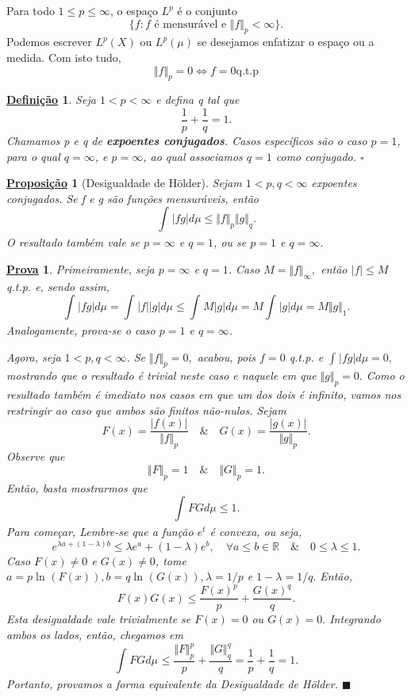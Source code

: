 \documentclass{article}
\newtheorem*{def*}{\underline{Defini\c c\~ao}}
\newtheorem*{prop*}{\underline{Proposi\c c\~ao}}
\newtheorem*{proof*}{\underline{Prova}}
\renewcommand\qedsymbol{$\blacksquare$}
\begin{document}
 Para todo \(1\leq p\leq \infty\), o espaço \(L^{p}\) é o conjunto 
   \[
     \{f: f \text{ é mensurável e }\Vert f \Vert_{p}<\infty\}.
   \]
   Podemos escrever \(L^{p}(X)\) ou \(L^{p}(\mu )\) se desejamos enfatizar o espaço ou a medida. Com isto tudo, 
     \[
       \Vert f \Vert_{p} = 0 \Longleftrightarrow f = 0 \mathrm{q.t.p}
     \]
 \begin{def*}
   Seja \(1 < p < \infty\) e defina q tal que 
     \[
       \frac{1}{p} + \frac{1}{q} = 1.
     \]
  Chamamos p e q de \textbf{expoentes conjugados}. Casos específicos são o caso \(p =1 \), para o qual \(q=\infty\), e \(p = \infty\), ao qual associamos \(q = 1\) como conjugado. \(\square\)
 \end{def*}
 \hypertarget{holder}{
   \begin{prop*}[Desigualdade de Hölder]
    Sejam \(1 < p, q < \infty\) expoentes conjugados. Se f e g são funções mensuráveis, então 
      \[
        \int_{}^{}|fg|d\mu \leq \Vert f \Vert_{p}\Vert g \Vert_{q}.
      \]
    O resultado também vale se \(p=\infty\) e \(q=1\), ou se \(p = 1\) e \(q=\infty\).
  \end{prop*}
 }
\begin{proof*}
  Primeiramente, seja \(p=\infty\) e \(q=1\). Caso \(M = \Vert f \Vert_{\infty},\) então \(|f|\leq M\) q.t.p. e, sendo assim, 
    \[
      \int_{}^{}|fg|d\mu = \int_{}^{}|f||g|d\mu \leq \int_{}^{}M|g|d\mu = M \int_{}^{}|g|d\mu = M \Vert g \Vert_{1}.
    \]
  Analogamente, prova-se o caso \(p=1\) e \(q=\infty\). 

  Agora, seja \(1 < p, q < \infty\). Se \(\Vert f \Vert_{p} = 0,\) acabou, pois \(f=0\) q.t.p. e \(\int_{}^{}|fg|d\mu  = 0,\) mostrando que o resultado é trivial neste caso e naquele em que \(\Vert g \Vert_{p} = 0.\) Como 
o resultado também é imediato nos casos em que um dos dois é infinito, vamos nos restringir ao caso que ambos são finitos não-nulos. Sejam 
  \[
    F(x) = \frac{|f(x)|}{\Vert f \Vert_{p}}\quad\&\quad G(x) = \frac{|g(x)|}{\Vert g \Vert_{p}}.
  \]
  Observe que 
    \[
      \Vert F \Vert_{p} = 1\quad\&\quad \Vert G \Vert_{p} = 1.
    \]
  Então, basta mostrarmos que 
    \[
      \int_{}^{}FGd\mu \leq 1.
    \]
    Para começar, Lembre-se que a função \(e^{t}\) é \textit{convexa}, ou seja,
      \[
        e^{\lambda a + (1-\lambda )b}\leq \lambda e^{a}+(1-\lambda )e^{b},\quad \forall a\leq b\in \mathbb{R}\quad\&\quad 0\leq \lambda \leq 1.
      \]
  Caso \(F(x)\neq0\) e \(G(x)\neq0\), tome \(a = p \ln^{}{(F(x))}, b = q\ln^{}{(G(x))}, \lambda = 1/p\) e \(1-\lambda =1/q.\) Então,
    \[
      F(x)G(x)\leq \frac{F(x)^{p}}{p} + \frac{G(x)^{q}}{q}.
    \]
  Esta desigualdade vale trivialmente se \(F(x) = 0\) ou \(G(x) = 0.\) Integrando ambos os lados, então, chegamos em 
    \[
      \int_{}FG d\mu_{}\leq \frac{\Vert F \Vert_{p}^{p}}{p}+\frac{\Vert G \Vert_{q}^{q}}{q} = \frac{1}{p} + \frac{1}{q} = 1.
    \]
  Portanto, provamos a forma equivalente da Desigualdade de Hölder. \qedsymbol
\end{proof*}
\end{document}
